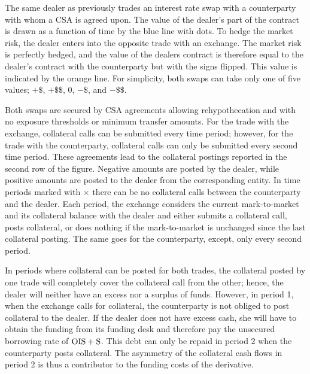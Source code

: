 \documentclass[main.tex]{subfiles}
\begin{document}
        \begin{example}
        The same dealer as previously trades an interest rate swap with a counterparty with whom a CSA is agreed upon. 
        The value of the dealer's part of the contract is drawn as a function of time 
        by the \textcolor{wtf-blue}{blue line} with dots.
        To hedge the market risk, the dealer enters into the opposite trade with an exchange.
        The market risk is perfectly hedged, and the value of the dealers contract is therefore
        equal to the dealer's contract with the counterparty but with the signs flipped.
        This value is indicated by the \textcolor{wtf-orange}{orange line}.
        For simplicity, both swaps can take only one of five values; $+\$$, $+\$\$$, $0$, $-\$$, and $-\$\$$.

        Both swaps are secured by CSA agreements allowing rehypothecation 
        and with no exposure thresholds or minimum transfer amounts.
        For the trade with the exchange, collateral calls can be submitted every time period;
        however, for the trade with the counterparty, collateral calls can only be submitted every second time period.
        These agreements lead to the collateral postings reported in the second row of the figure.
        Negative amounts are posted by the dealer, while positive amounts are posted to the dealer 
        from the corresponding entity.
        In time periods marked with $\boldsymbol{\times}$ 
        there can be no collateral calls between the counterparty and the dealer.
        Each period, the exchange considers the current mark-to-market and its collateral balance with the dealer
        and either submits a collateral call, posts collateral, 
        or does nothing if the mark-to-market is unchanged since the last collateral posting.
        The same goes for the counterparty, except, only every second period.

        In periods where collateral can be posted for both trades, 
        the collateral posted by one trade will completely cover the collateral call from the other;
        hence, the dealer will neither have an excess nor a surplus of funds.
        However, in period 1, when the exchange calls for collateral,
        the counterparty is not obliged to post collateral to the dealer. 
        If the dealer does not have excess cash, 
        she will have to obtain the funding from its funding desk
        and therefore pay the unsecured borrowing rate of $\OIS/ + \text{S}$. 
        This debt can only be repaid in period 2 when the counterparty posts collateral.
        The asymmetry of the collateral cash flows in period 2
        is thus a contributor to the funding costs of the derivative.


\end{example}
\end{document}
